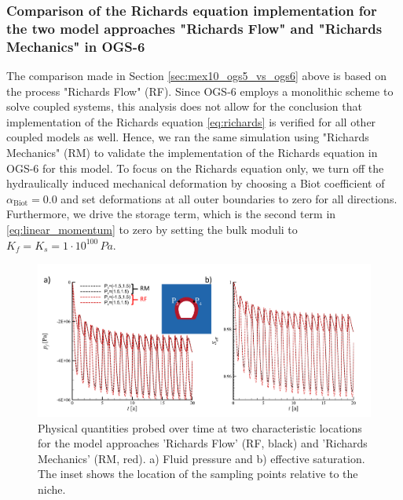 \subsubsection{Comparison of the Richards equation implementation for the two model approaches "Richards Flow" and "Richards Mechanics" in OGS-6}\label{sec:RM_no_M}
The comparison made in Section \ref{sec:mex10_ogs5_vs_ogs6} above is based on the process "Richards Flow" (RF). Since OGS-6 employs a monolithic scheme to solve coupled systems, this analysis does not allow for the conclusion that implementation of the Richards equation \eqref{eq:richards} is verified for all other coupled models as well. Hence, we ran the same simulation using "Richards Mechanics" (RM) to validate the implementation of the Richards equation in OGS-6 for this model. To focus on the Richards equation only, we turn off the hydraulically induced mechanical deformation by choosing a Biot coefficient of $\alpha_\text{Biot}=0.0$ and set deformations at all outer boundaries to zero for all directions. Furthermore, we drive the storage term, which is the second term in \eqref{eq:linear_momentum} to zero by setting the bulk moduli to $K_f=K_s=1\cdot 10^{100}\, Pa$. 

\begin{figure}[t]
\includegraphics[width=\textwidth]{./figures/MEX10_cf_RF_RM.png}
\caption{Physical quantities probed over time at two characteristic locations for the model approaches 'Richards Flow' (RF, black) and 'Richards Mechanics' (RM, red). a) Fluid pressure and b) effective saturation. The inset shows the location of the sampling points relative to the niche.}
\label{fig:probe_RM_RF}
\end{figure}

